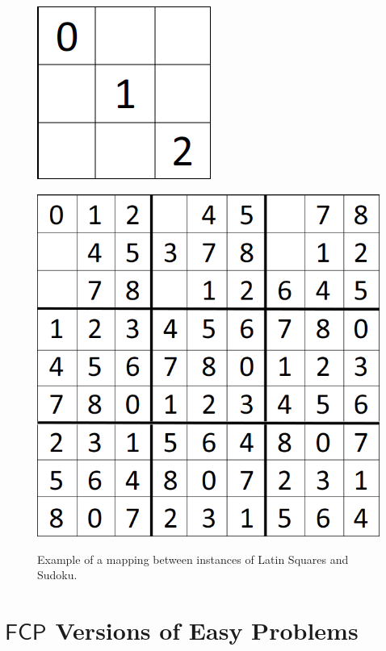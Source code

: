 \documentclass[runningheads,a4paper]{llncs}
\begin{document}
\begin{figure}[H]
\begin{minipage}{0.45\textwidth}
\includegraphics[scale=0.25]{sudoku-3.png}
\label{fig:partialNP}
\end{minipage}
\hfill
\begin{minipage}{0.45\textwidth}
\centering
\label{fig:partialLS}
\includegraphics[scale=0.25]{sudoku-1.png}
\end{minipage}
\caption{Example of a mapping between instances of Latin Squares and Sudoku.}
\end{figure}

\section{$\mathsf{FCP}$ Versions of Easy Problems}
\end{document}
